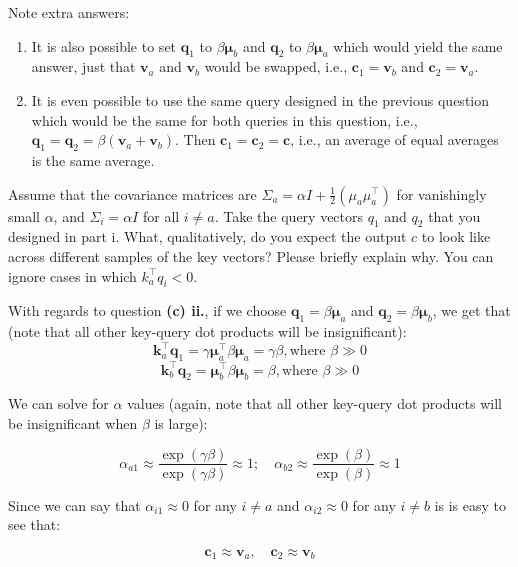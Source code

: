 \begin{parts}
\begin{subparts}
\begin{answer}
    Note extra answers:
    \begin{enumerate}
        \item It is also possible to set $\mathbf{q}_1$ to $\beta \mathbf{\mu}_b$ and $\mathbf{q}_2$ to $\beta \mathbf{\mu}_a$ which would yield the same answer, just that $\mathbf{v}_a$ and $\mathbf{v}_b$ would be swapped, i.e., $\mathbf{c}_1=\mathbf{v}_b$ and $\mathbf{c}_2=\mathbf{v}_a$.
        \item It is even possible to use the same query designed in the previous question which would be the same for both queries in this question, i.e., $\mathbf{q}_1=\mathbf{q}_2=\beta(\mathbf{v}_a+\mathbf{v}_b)$. Then $\mathbf{c}_1=\mathbf{c}_2=\mathbf{c}$, i.e., an average of equal averages is the same average.
    \end{enumerate}
\end{answer}

\subpart[2]
Assume that the covariance matrices are $\Sigma_a=\alpha I + \frac{1}{2}(\mu_a\mu_a^\top)$ for vanishingly small $\alpha$, and $\Sigma_i=\alpha I$  for all $i \neq a$.
Take the query vectors $q_1$ and $q_2$ that you designed in part i.
What, qualitatively, do you expect the output $c$ to look like across different samples of the key vectors? Please briefly explain why. You can ignore cases in which $k_a^\top q_i < 0$.

\begin{answer}
    With regards to question \textbf{(c) ii.}, if we choose $\mathbf{q}_1=\beta \mathbf{\mu}_a$ and $\mathbf{q}_2=\beta \mathbf{\mu}_b$, we get that (note that all other key-query dot products will be insignificant):
    $$\mathbf{k}_a^{\top}\mathbf{q}_1=\gamma\mathbf{\mu}_a^{\top}\beta \mathbf{\mu}_a=\gamma\beta, \text{where }\beta \gg 0$$
    $$\mathbf{k}_b^{\top}\mathbf{q}_2=\mathbf{\mu}_b^{\top}\beta \mathbf{\mu}_b=\beta, \text{where }\beta \gg 0$$
    
    We can solve for $\alpha$ values (again, note that all other key-query dot products will be insignificant when $\beta$ is large):
    
    $$\alpha_{a1}\approx\frac{\exp(\gamma\beta)}{\exp(\gamma\beta)}\approx 1;\quad \alpha_{b2}\approx\frac{\exp(\beta)}{\exp(\beta)}\approx 1$$
    
    Since we can say that $\alpha_{i1}\approx 0$ for any $i\ne a$ and $\alpha_{i2}\approx 0$ for any $i\ne b$ is is easy to see that:
    
    $$\mathbf{c}_1\approx \mathbf{v}_a, \quad \mathbf{c}_2\approx \mathbf{v}_b$$
    

\end{answer}
\end{subparts}
\end{parts}
